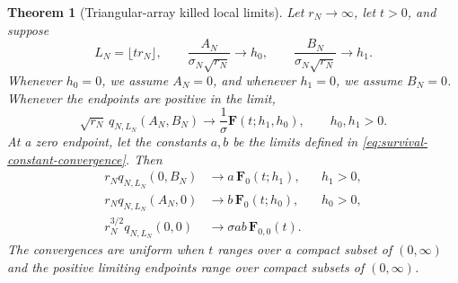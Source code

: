 \documentclass[11pt]{article}
\theoremstyle{plain}
\newtheorem{theorem}[lemma]{Theorem}
\theoremstyle{definition}
\theoremstyle{remark}
\begin{document}
\begin{theorem}[Triangular-array killed local limits]
\label{thm:killed-local-limits}
Let \(r_N\to\infty\), let \(t>0\), and suppose
\[
 L_N=\lfloor tr_N\rfloor,\qquad
 \frac{A_N}{\sigma_N\sqrt{r_N}}\longrightarrow h_0,\qquad
 \frac{B_N}{\sigma_N\sqrt{r_N}}\longrightarrow h_1 .
\]
Whenever \(h_0=0\), we assume \(A_N=0\), and whenever \(h_1=0\),
we assume \(B_N=0\).  
Whenever the endpoints are positive in the limit,
\begin{equation}
 \sqrt{r_N}\,q_{N,L_N}(A_N,B_N)
 \longrightarrow
 \frac1\sigma\mathbf F(t;h_1,h_0),
 \qquad h_0,h_1>0.                                  \label{eq:pp-limit}
\end{equation}
At a zero endpoint, let the constants \(a,b\) be the limits defined
in \eqref{eq:survival-constant-convergence}. Then
\begin{align}
 r_N q_{N,L_N}(0,B_N)
 &\longrightarrow a\,\mathbf F_0(t;h_1),
 && h_1>0,                                            \label{eq:0p-limit}\\
 r_N q_{N,L_N}(A_N,0)
 &\longrightarrow b\,\mathbf F_0(t;h_0),
 && h_0>0,                                            \label{eq:p0-limit}\\
 r_N^{3/2} q_{N,L_N}(0,0)
 &\longrightarrow \sigma ab\,\mathbf F_{0,0}(t).
                                                           \label{eq:00-limit}
\end{align}
The convergences are uniform when \(t\) ranges over a compact subset of
\((0,\infty)\) and the positive limiting endpoints range over compact
subsets of \((0,\infty)\).
\end{theorem}
\end{document}
